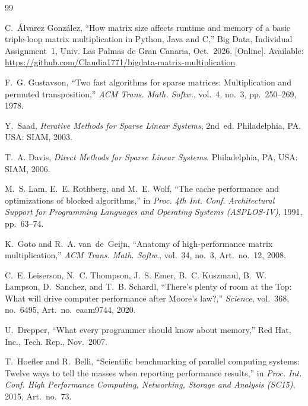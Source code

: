 \documentclass[12pt,a4paper]{report}
\begin{document}
\begin{thebibliography}{99}

 C.~Álvarez González, ``How matrix size affects runtime and memory of a basic triple-loop matrix
multiplication in Python, Java and C,'' Big Data, Individual Assignment~1, Univ. Las Palmas de Gran Canaria, Oct.~2026.
[Online]. Available: \url{https://github.com/Claudia1771/bigdata-matrix-multiplication}

 F.~G. Gustavson, ``Two fast algorithms for sparse matrices: Multiplication and permuted
transposition,'' \textit{ACM Trans. Math. Softw.}, vol.~4, no.~3, pp.~250--269, 1978.

 Y.~Saad, \textit{Iterative Methods for Sparse Linear Systems}, 2nd~ed. Philadelphia, PA, USA:
SIAM, 2003.

 T.~A. Davis, \textit{Direct Methods for Sparse Linear Systems}. Philadelphia, PA, USA: SIAM, 2006.

 M.~S. Lam, E.~E. Rothberg, and M.~E. Wolf, ``The cache performance and optimizations of blocked
algorithms,'' in \textit{Proc. 4th Int. Conf. Architectural Support for Programming Languages and Operating Systems
(ASPLOS-IV)}, 1991, pp.~63--74.

 K.~Goto and R.~A. van~de~Geijn, ``Anatomy of high-performance matrix multiplication,''
\textit{ACM Trans. Math. Softw.}, vol.~34, no.~3, Art.~no.~12, 2008.

 C.~E. Leiserson, N.~C. Thompson, J.~S. Emer, B.~C. Kuszmaul, B.~W. Lampson, D.~Sanchez, and
T.~B. Schardl, ``There's plenty of room at the Top: What will drive computer performance after Moore's law?,''
\textit{Science}, vol.~368, no.~6495, Art.~no.~eaam9744, 2020.

 U.~Drepper, ``What every programmer should know about memory,'' Red Hat, Inc., Tech. Rep.,
Nov.~2007.

 T.~Hoefler and R.~Belli, ``Scientific benchmarking of parallel computing systems: Twelve ways to
tell the masses when reporting performance results,'' in \textit{Proc. Int. Conf. High Performance Computing,
Networking, Storage and Analysis (SC15)}, 2015, Art.~no.~73.

\end{thebibliography}
\end{document}
